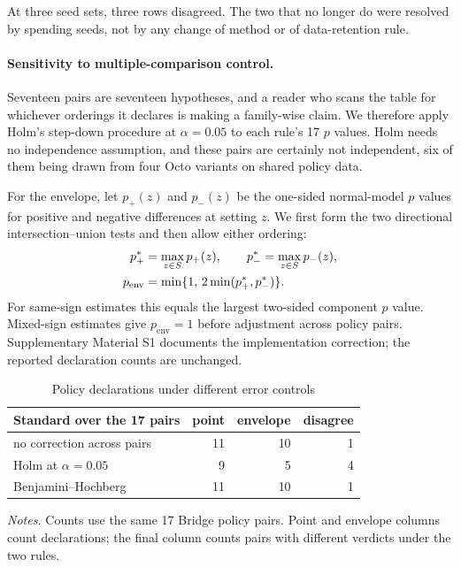 \documentclass[pdflatex,iicol,sn-apa]{sn-jnl}
\theoremstyle{remark}
\newcommand{\tablenote}[1]{\par\vspace{4pt}\noindent
\begin{minipage}{\linewidth}\tablefootnotefont\raggedright #1\par\end{minipage}}
\begin{document}
At three seed sets, three rows disagreed. The two that no longer do were resolved by spending seeds,
not by any change of method or of data-retention rule.

\paragraph{Sensitivity to multiple-comparison control.}
Seventeen pairs are seventeen hypotheses, and a reader who scans the table for whichever orderings
it declares is making a family-wise claim. We therefore apply Holm's step-down procedure at
$\alpha = 0.05$ to each rule's 17 $p$ values. Holm needs no independence assumption, and these
pairs are certainly not independent, six of them being drawn from four Octo variants on shared
policy data.

For the envelope, let $p_+(z)$ and $p_-(z)$ be the one-sided normal-model $p$ values for
positive and negative differences at setting $z$. We first form the two directional
intersection--union tests and then allow either ordering:
\begin{align}
 p_+^* &= \max_{z\in S}p_+(z),\qquad p_-^* = \max_{z\in S}p_-(z), \notag\\
 p_{\mathrm{env}} &= \min\{1,\,2\min(p_+^*,p_-^*)\}. \label{eq:directional_iut}
\end{align}
For same-sign estimates this equals the largest two-sided component $p$ value. Mixed-sign
estimates give $p_{\mathrm{env}}=1$ before adjustment across policy pairs. Supplementary
Material S1 documents the implementation correction; the reported declaration counts are unchanged.

\begin{table}[h]
\caption{Policy declarations under different error controls}\label{tab6b}
\begin{tabular}{@{}lrrr@{}}
\toprule
Standard over the 17 pairs & point & envelope & disagree \\
\midrule
no correction across pairs & 11 & 10 & 1 \\
Holm at $\alpha = 0.05$ & 9 & 5 & 4 \\
Benjamini--Hochberg & 11 & 10 & 1 \\
\bottomrule
\end{tabular}
\tablenote{\textit{Notes.} Counts use the same 17 Bridge policy pairs. Point and envelope columns count declarations; the final column counts pairs with different verdicts under the two rules.}
\end{table}
\end{document}

